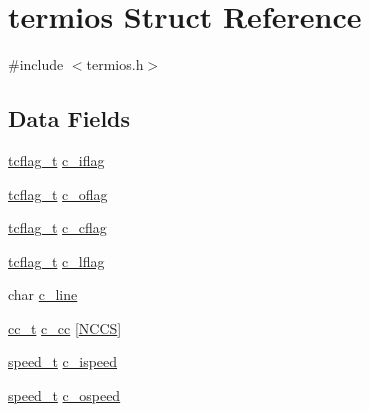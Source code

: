 \hypertarget{structtermios}{\section{termios \-Struct \-Reference}
\label{structtermios}
}


{\ttfamily \#include $<$termios.\-h$>$}

\subsection*{\-Data \-Fields}
\begin{DoxyCompactItemize}
\item 
\hyperlink{termios_8h_a12046b4322de1f4b85ed29267aa8173a}{tcflag\-\_\-t} \hyperlink{structtermios_a3e416181096da14aacc3a5aaa3138d3e}{c\-\_\-iflag}
\item 
\hyperlink{termios_8h_a12046b4322de1f4b85ed29267aa8173a}{tcflag\-\_\-t} \hyperlink{structtermios_a615efcbde1bbfd1f2c28b3a62bd05add}{c\-\_\-oflag}
\item 
\hyperlink{termios_8h_a12046b4322de1f4b85ed29267aa8173a}{tcflag\-\_\-t} \hyperlink{structtermios_ac6409888277d696c033f0068b33d5acc}{c\-\_\-cflag}
\item 
\hyperlink{termios_8h_a12046b4322de1f4b85ed29267aa8173a}{tcflag\-\_\-t} \hyperlink{structtermios_ad03044b6d30bc840e24751ea465651af}{c\-\_\-lflag}
\item 
char \hyperlink{structtermios_a4f3a2260ca7ad16657ba7de6cac4a146}{c\-\_\-line}
\item 
\hyperlink{termios_8h_a02a4a51b25871e505aad0dcae945a0dc}{cc\-\_\-t} \hyperlink{structtermios_a06ea1504c051c8b60c9e5d04b63877dd}{c\-\_\-cc} \mbox{[}\hyperlink{termios_8h_a15cde8857ad26391c93358f528e7e13a}{\-N\-C\-C\-S}\mbox{]}
\item 
\hyperlink{termios_8h_a897bee08bb5174220844fc9313da03e7}{speed\-\_\-t} \hyperlink{structtermios_a580354cdd25cd1c26222ab4ff6783be9}{c\-\_\-ispeed}
\item 
\hyperlink{termios_8h_a897bee08bb5174220844fc9313da03e7}{speed\-\_\-t} \hyperlink{structtermios_af5ea2ab180c38bf961799a84ff8bde67}{c\-\_\-ospeed}
\end{DoxyCompactItemize}


